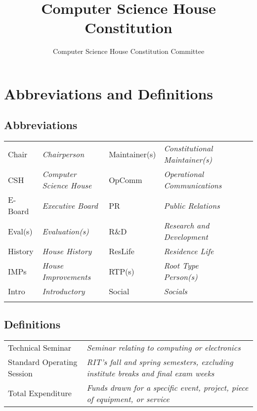 \documentclass{article}
\title{Computer Science House Constitution}
\author{Computer Science House Constitution Committee}
\date{\datechanged}
\newcommand{\article}[1]{\section{#1} \label{#1}}
\begin{document}
\maketitle

\tableofcontents
\setcounter{page}{4}

\article{Abbreviations and Definitions}

\subsection{Abbreviations}
\begin{tabular}{ l  l  l l l l}
	Chair   & \textit{Chairperson}            & Maintainer(s) & \textit{Constitutional Maintainer(s)} \\
	CSH     & \textit{Computer Science House} & OpComm        & \textit{Operational Communications}   \\
	E-Board & \textit{Executive Board}        & PR            & \textit{Public Relations}             \\
	Eval(s) & \textit{Evaluation(s)}          & R\&D          & \textit{Research and Development}     \\
	History & \textit{House History}          & ResLife       & \textit{Residence Life}               \\
	IMPs    & \textit{House Improvements}     & RTP(s)        & \textit{Root Type Person(s)}          \\
	Intro   & \textit{Introductory}           & Social        & \textit{Socials}                      \\                                  \\
\end{tabular}

\subsection{Definitions}

\begin{tabular}{l l}
	Technical Seminar          & \textit{Seminar relating to computing or electronics}                                     \\
	Standard Operating Session & \textit{RIT's fall and spring semesters, excluding institute breaks and final exam weeks} \\
	Total Expenditure          & \textit{Funds drawn for a specific event, project, piece of equipment, or service}
\end{tabular}
\end{document}
